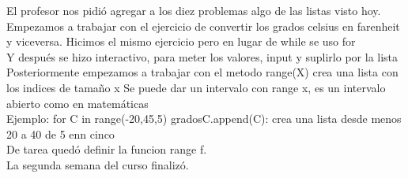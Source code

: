 \documentclass[letterpaper, 12pt, oneside]{article}%
\begin{document}
El profesor nos pidió agregar a los diez problemas algo de las listas visto hoy.\\
Empezamos a trabajar con el ejercicio de convertir los grados celsius en farenheit y viceversa. Hicimos el mismo ejercicio pero en lugar de while se uso for \\
Y después se hizo interactivo, para meter los valores, input y suplirlo por la lista\\
Posteriormente empezamos a trabajar con el metodo range(X) crea una lista con los indices de tamaño x
Se puede dar un intervalo con range x, es un intervalo abierto como en matemáticas\\
Ejemplo: for C in range(-20,45,5) gradosC.append(C): crea una lista desde menos 20 a 40 de 5 enn cinco\\
De tarea quedó definir la funcion range f. \\
La segunda semana del curso finalizó.
\end{document}
